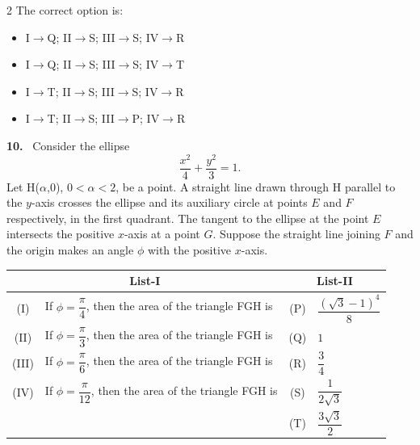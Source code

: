 \documentclass[10pt]{extarticle}
\newcommand{\qn}[1]{\par\smallskip\noindent\textbf{#1.}~}
\newenvironment{qoptions}{\begin{itemize}[leftmargin=1.8em,itemsep=1pt,topsep=2pt,label={}]}{\end{itemize}}
\newcommand{\opt}[2]{\item[(#1)] #2}
\begin{document}
\begin{multicols}{2}
The correct option is:
\begin{qoptions}
\opt{A}{I$\to$Q; II$\to$S; III$\to$S; IV$\to$R}
\opt{B}{I$\to$Q; II$\to$S; III$\to$S; IV$\to$T}
\opt{C}{I$\to$T; II$\to$S; III$\to$S; IV$\to$R}
\opt{D}{I$\to$T; II$\to$S; III$\to$P; IV$\to$R}
\end{qoptions}

\qn{10} Consider the ellipse
$$\dfrac{x^2}{4}+\dfrac{y^2}{3}=1.$$
Let H($\alpha$,0), $0<\alpha<2$, be a point. A straight line drawn through H parallel to the $y$-axis crosses the ellipse and its auxiliary circle at points $E$ and $F$ respectively, in the first quadrant. The tangent to the ellipse at the point $E$ intersects the positive $x$-axis at a point $G$. Suppose the straight line joining $F$ and the origin makes an angle $\phi$ with the positive $x$-axis.
\end{multicols}
\begin{center}
\begin{tabular}{|c|p{5cm}|c|l|}
\hline
\multicolumn{2}{|c|}{List-I} & \multicolumn{2}{c|}{List-II} \\
\hline
(I) & If $\phi=\dfrac{\pi}{4}$, then the area of the triangle FGH is & (P) & $\dfrac{(\sqrt3-1)^4}{8}$ \\
\hline
(II) & If $\phi=\dfrac{\pi}{3}$, then the area of the triangle FGH is & (Q) & $1$ \\
\hline
(III) & If $\phi=\dfrac{\pi}{6}$, then the area of the triangle FGH is & (R) & $\dfrac34$ \\
\hline
(IV) & If $\phi=\dfrac{\pi}{12}$, then the area of the triangle FGH is & (S) & $\dfrac{1}{2\sqrt3}$ \\
\hline
& & (T) & $\dfrac{3\sqrt3}{2}$ \\
\hline
\end{tabular}
\end{center}
\end{document}
